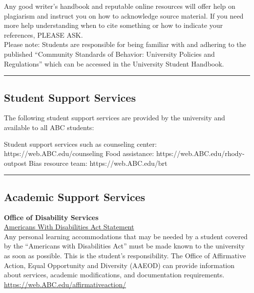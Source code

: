 Any good writer’s handbook and reputable online resources will offer help on plagiarism and instruct you on how to acknowledge source material. If you need more help understanding when to cite something or how to indicate your references, PLEASE ASK.\\

Please note:  Students are responsible for being familiar with and adhering to the published ``Community Standards of Behavior: University Policies and Regulations'' which can be accessed in the University Student Handbook.\\

 \vspace{2ex}\hrule\vspace{2ex}

\subsection*{Student Support Services}
The following student support services are provided by the university and available to all ABC students: 
\begin{outline}
	\1	Student support services such as counseling center: https://web.ABC.edu/counseling 
	\1	Food assistance: https://web.ABC.edu/rhody-outpost 
	\1	Bias resource team: https://web.ABC.edu/brt 
\end{outline}

\vspace{2ex}\hrule\vspace{2ex}





\subsection*{Academic Support Services}

\textbf{Office of Disability Services}\\
\underline{Americans With Disabilities Act Statement}\\

Any personal learning accommodations that may be needed by a student covered by the ``Americans with Disabilities Act'' must be made known to the university as soon as possible.  This is the student's responsibility. The Office of Affirmative Action, Equal Opportunity and Diversity (AAEOD) can provide information about services, academic modifications, and documentation requirements. \url{https://web.ABC.edu/affirmativeaction/}\\


